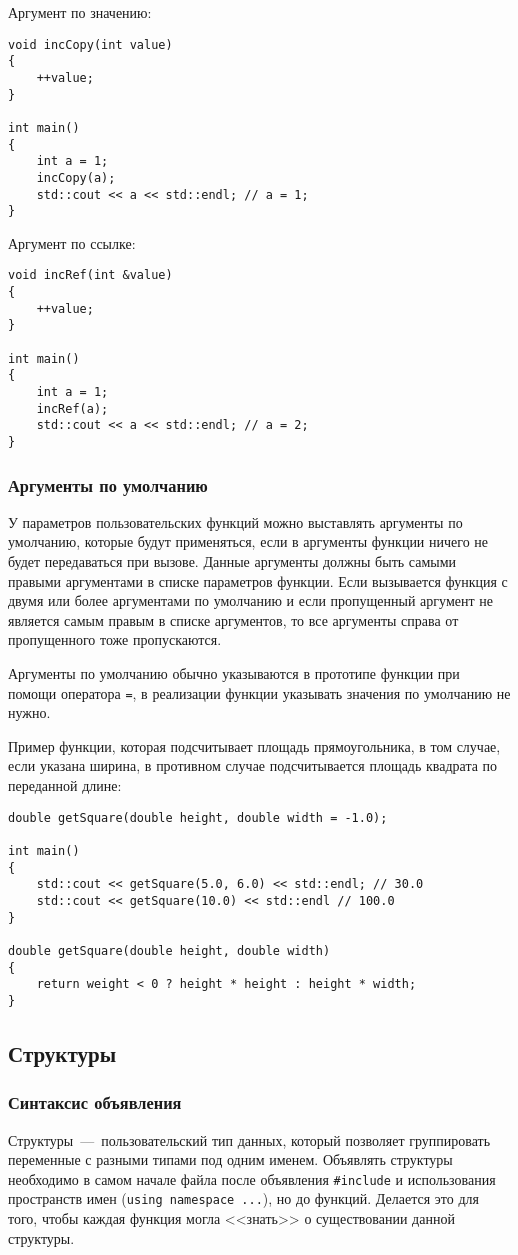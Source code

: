 Аргумент по значению:
\begin{lstlisting}
void incCopy(int value)
{
    ++value;
}

int main()
{
    int a = 1;
    incCopy(a);
    std::cout << a << std::endl; // a = 1;
}
\end{lstlisting}

Аргумент по ссылке:
\begin{lstlisting}
void incRef(int &value)
{
    ++value;
}

int main()
{
    int a = 1;
    incRef(a);
    std::cout << a << std::endl; // a = 2;
}
\end{lstlisting}

\subsubsection{Аргументы по умолчанию}
У параметров пользовательских функций можно выставлять аргументы по умолчанию, которые будут применяться, если в аргументы функции ничего не будет передаваться при вызове. Данные аргументы должны быть самыми правыми аргументами в списке параметров функции. Если вызывается функция с двумя или более аргументами по умолчанию и если пропущенный аргумент не является самым правым в списке аргументов, то все аргументы справа от пропущенного тоже пропускаются.

Аргументы по умолчанию обычно указываются в прототипе функции при помощи оператора \lstinline|=|, в реализации функции указывать значения по умолчанию не нужно.

Пример функции, которая подсчитывает площадь прямоугольника, в том случае, если указана ширина, в противном случае подсчитывается площадь квадрата по переданной длине:

\begin{lstlisting}
double getSquare(double height, double width = -1.0);

int main()
{
    std::cout << getSquare(5.0, 6.0) << std::endl; // 30.0
    std::cout << getSquare(10.0) << std::endl // 100.0
}

double getSquare(double height, double width)
{
    return weight < 0 ? height * height : height * width;
}
\end{lstlisting}

\subsection{Структуры}
\subsubsection{Синтаксис объявления}
Структуры~---~пользовательский тип данных, который позволяет группировать переменные с разными типами под одним именем. Объявлять структуры необходимо в самом начале файла после объявления \lstinline|#include| и использования пространств имен (\lstinline|using namespace ...|), но до функций. Делается это для того, чтобы каждая функция могла <<знать>> о существовании данной структуры.

